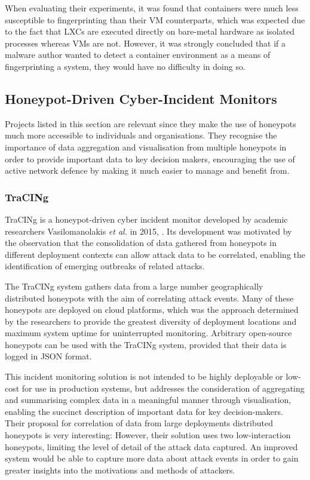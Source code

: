 When evaluating their experiments, it was found that containers were much less susceptible to fingerprinting than their VM counterparts, which was expected due to the fact that LXCs are executed directly on bare-metal hardware as isolated processes whereas VMs are not. However, it was strongly concluded that if a malware author wanted to detect a container environment as a means of fingerprinting a system, they would have no difficulty in doing so. 
    

\subsection{Honeypot-Driven Cyber-Incident Monitors} \label{RelatedIncidentMonitorProjects}
Projects listed in this section are relevant since they make the use of honeypots much more accessible to individuals and organisations. They recognise the importance of data aggregation and visualisation from multiple honeypots in order to provide important data to key decision makers, encouraging the use of active network defence by making it much easier to manage and benefit from.

	\subsubsection{TraCINg} \label{AboutTraCINg}
    
    TraCINg is a honeypot-driven cyber incident monitor developed by academic researchers Vasilomanolakis \textit{et al.} in 2015, \cite{Vasilomanolakis}. Its development was motivated by the observation that the consolidation of data gathered from honeypots in different deployment contexts can allow attack data to be correlated, enabling the identification of emerging outbreaks of related attacks. 
    
    The TraCINg system gathers data from a large number geographically distributed honeypots with the aim of correlating attack events. Many of these honeypots are deployed on cloud platforms, which was the approach determined by the researchers to provide the greatest diversity of deployment locations and maximum system uptime for uninterrupted monitoring. Arbitrary open-source honeypots can be used with the TraCINg system, provided that their data is logged in JSON format.
    
   This incident monitoring solution is not intended to be highly deployable or low-cost for use in production systems, but addresses the consideration of aggregating and summarising complex data in a meaningful manner through visualisation, enabling the succinct description of important data for key decision-makers. Their proposal for correlation of data from large deployments distributed honeypots is very interesting: However, their solution uses two low-interaction honeypots, limiting the level of detail of the attack data captured. An improved system would be able to capture more data about attack events in order to gain greater insights into the motivations and methods of attackers.

